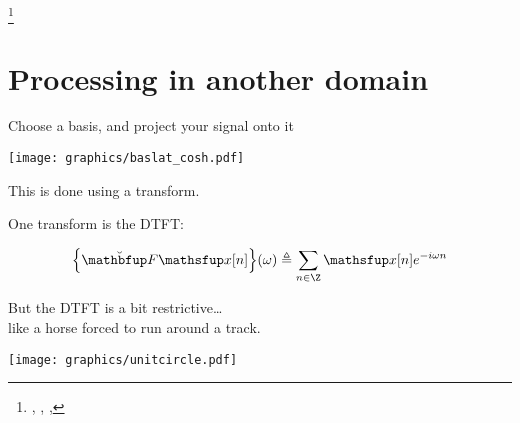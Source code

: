 \newpage
\label{thm:bat}
\footnote{
  ,
  ,
  ,
  }




\newpage
\section{Processing in another domain}
Choose a basis, and project your signal onto it

\texttt{[image: graphics/baslat\_cosh.pdf]}

This is done using a transform. 

\newpage
One transform is the DTFT:


\[{\brb{\opDTFT \fx[n]}(\omega) \eqd \sum_{n\in\Z} \fx[n] e^{-i\omega n}}\]

\newpage

But the DTFT is a bit restrictive\ldots\\ like a horse forced to run around a track.

\texttt{[image: graphics/unitcircle.pdf]}

